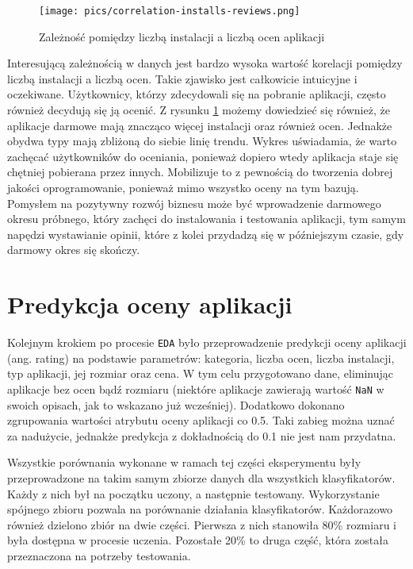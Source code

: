 \documentclass{article}
\begin{document}
\begin{figure}[!h]
\centering
    \texttt{[image: pics/correlation-installs-reviews.png]}
    \caption{Zależność pomiędzy liczbą instalacji a liczbą ocen aplikacji}
    \label{fig:reviews-installs}
\end{figure}

Interesującą zależnością w danych jest bardzo wysoka wartość korelacji pomiędzy liczbą instalacji a liczbą ocen. Takie zjawisko jest całkowicie intuicyjne i oczekiwane. Użytkownicy, którzy zdecydowali się na pobranie aplikacji, często również decydują się ją ocenić. Z rysunku \ref{fig:reviews-installs} możemy dowiedzieć się również, że aplikacje darmowe mają znacząco więcej instalacji oraz również ocen. Jednakże obydwa typy mają zbliżoną do siebie linię trendu. Wykres uświadamia, że warto zachęcać użytkowników do oceniania, ponieważ dopiero wtedy aplikacja staje się chętniej pobierana przez innych. Mobilizuje to z pewnością do tworzenia dobrej jakości oprogramowanie, ponieważ mimo wszystko oceny na tym bazują. Pomysłem na pozytywny rozwój biznesu może być wprowadzenie darmowego okresu próbnego, który zachęci do instalowania i testowania aplikacji, tym samym napędzi wystawianie opinii, które z kolei przydadzą się w późniejszym czasie, gdy darmowy okres się skończy.

\section{Predykcja oceny aplikacji}
Kolejnym krokiem po procesie \texttt{EDA} było przeprowadzenie predykcji oceny aplikacji (ang. rating) na podstawie parametrów: kategoria, liczba ocen, liczba instalacji, typ aplikacji, jej rozmiar oraz cena. W tym celu przygotowano dane, eliminując aplikacje bez ocen bądź rozmiaru (niektóre aplikacje zawierają wartość \texttt{NaN} w swoich opisach, jak to wskazano już wcześniej). Dodatkowo dokonano zgrupowania wartości atrybutu oceny aplikacji co 0.5. Taki zabieg można uznać za nadużycie, jednakże predykcja z dokładnością do 0.1 nie jest nam przydatna.

Wszystkie porównania wykonane w ramach tej części eksperymentu były przeprowadzone na takim samym zbiorze danych dla wszystkich klasyfikatorów. Każdy z nich był na początku uczony, a następnie testowany. Wykorzystanie spójnego zbioru pozwala na porównanie działania klasyfikatorów. Każdorazowo również dzielono zbiór na dwie części. Pierwsza z nich stanowiła 80\% rozmiaru i była dostępna w procesie uczenia. Pozostałe 20\% to druga część, która została przeznaczona na potrzeby testowania.
\end{document}
